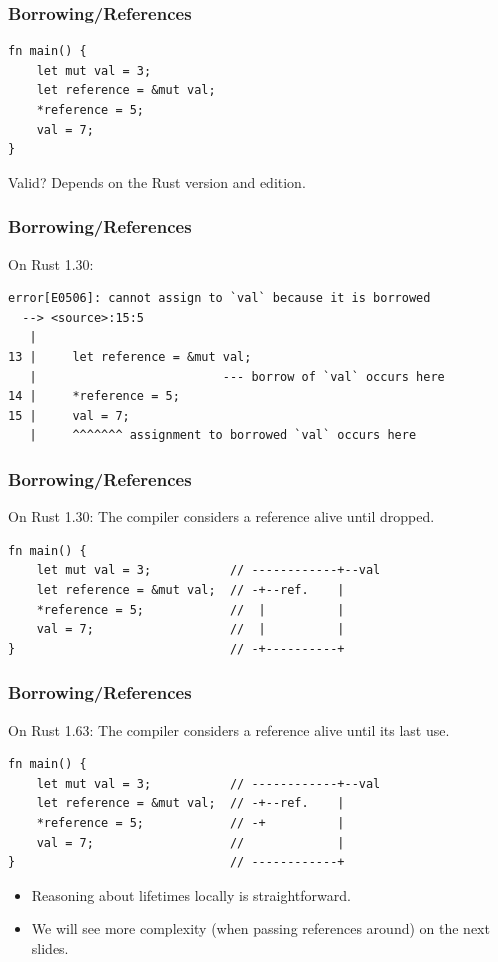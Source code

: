 \begin{frame}[fragile]
    \frametitle{Borrowing/References}
    \begin{verbatim}
fn main() {
    let mut val = 3;
    let reference = &mut val;
    *reference = 5;
    val = 7;
}
    \end{verbatim}
    Valid?
    \pause
    \vfill
    Depends on the Rust version and edition.
\end{frame}

\begin{frame}[fragile]
    \frametitle{Borrowing/References}
    On Rust 1.30:
    \vfill
    \begin{verbatim}
error[E0506]: cannot assign to `val` because it is borrowed
  --> <source>:15:5
   |
13 |     let reference = &mut val;
   |                          --- borrow of `val` occurs here
14 |     *reference = 5;
15 |     val = 7;
   |     ^^^^^^^ assignment to borrowed `val` occurs here
    \end{verbatim}
\end{frame}

\begin{frame}[fragile]
    \frametitle{Borrowing/References}
    On Rust 1.30: The compiler considers a reference alive until dropped.
    \vfill
    \begin{verbatim}
fn main() {
    let mut val = 3;           // ------------+--val
    let reference = &mut val;  // -+--ref.    |
    *reference = 5;            //  |          |
    val = 7;                   //  |          |
}                              // -+----------+
    \end{verbatim}
\end{frame}

\begin{frame}[fragile]
    \frametitle{Borrowing/References}
    On Rust 1.63: The compiler considers a reference alive until its last use.
    \vfill
    \begin{verbatim}
fn main() {
    let mut val = 3;           // ------------+--val
    let reference = &mut val;  // -+--ref.    |
    *reference = 5;            // -+          |
    val = 7;                   //             |
}                              // ------------+
    \end{verbatim}
    \pause
    \vfill
    \begin{itemize}
        \item Reasoning about lifetimes locally is straightforward.
        \item We will see more complexity (when passing references around) on the next slides.
    \end{itemize}
\end{frame}

